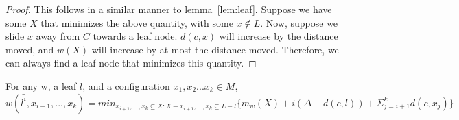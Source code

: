 \begin{proof}
    This follows in a similar manner to lemma~\ref{lem:leaf}. Suppose we have some $X$ that minimizes the above quantity, with some $x \not \in L$. Now, suppose we slide $x$ away from $C$ towards a leaf node. $d(c, x)$ will increase by the distance moved, and $w(X)$ will increase by at most the distance moved. Therefore, we can always find a leaf node that minimizes this quantity.
\end{proof}

\begin{lemma}
    For any w, a leaf $l$, and a configuration $x_1, x_2 ... x_k \in M$, 
    \begin{equation*}
            w(\bar{l^i}, x_{i+1}, ..., x_k) = min_{x_{i+1}, ..., x_k \subseteq X : X - x_{i+1}, ... , x_k \subseteq L - l}\{ m_w(X) + i(\Delta - d(c, l)) + \Sigma_{j=i+1} ^ k d(c, x_j)\}
    \end{equation*}
\end{lemma}

